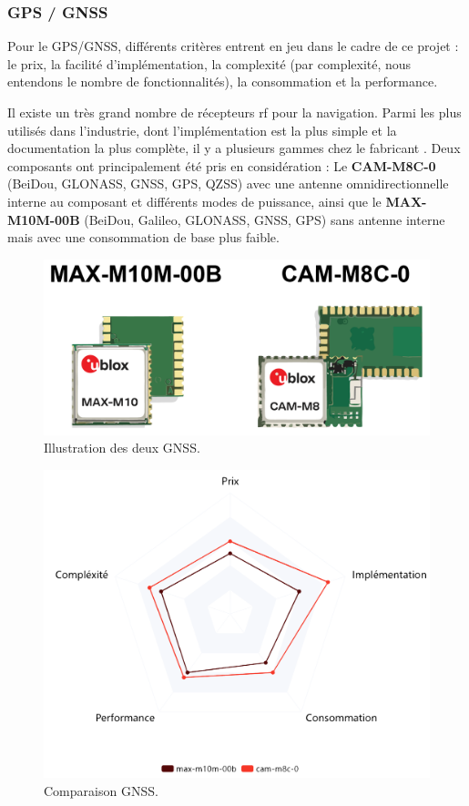\clearpage

\subsubsection{GPS / GNSS}
Pour le \gls{GPS}/\gls{GNSS}, différents critères entrent en jeu dans le cadre de ce projet : le prix, la facilité d'implémentation, la complexité (par complexité, nous entendons le nombre de fonctionnalités), la consommation et la performance.

Il existe un très grand nombre de récepteurs \gls{rf} pour la navigation. Parmi les plus utilisés dans l'industrie, dont l'implémentation est la plus simple et la documentation la plus complète, il y a plusieurs gammes chez le fabricant .
Deux composants ont principalement été pris en considération :
Le \textbf{CAM-M8C-0} (BeiDou, GLONASS, GNSS, GPS, QZSS) avec une antenne omnidirectionnelle interne au composant et différents modes de puissance, ainsi que le \textbf{MAX-M10M-00B} (BeiDou, Galileo, GLONASS, GNSS, GPS) sans antenne interne mais avec une consommation de base plus faible.

\begin{figure}[h]
	\centering
	\includegraphics[width=0.6\linewidth]{../figures/pre_etude/img_gnss}
	\caption{Illustration des deux GNSS.}
	\label{fig:imggnss}
\end{figure}


\begin{figure}[h]
	\centering
	\includegraphics[width=0.6\linewidth]{../figures/pre_etude/Comp_GNSS}
	\caption{Comparaison GNSS.}
	\label{fig:compgnss}
\end{figure}

